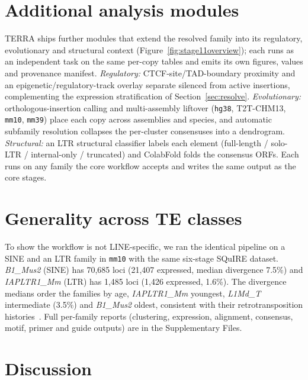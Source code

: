 \documentclass[11pt]{article}
\newcommand{\protoFamily}{L1Md\_T}
\newcommand{\protoAssembly}{mm10}
\newcommand{\protoMedianDiv}{3.5}
\newcommand{\bOneMTLoci}{70,685}
\newcommand{\bOneMTExprLoci}{21,407}
\newcommand{\bOneMTMedianDiv}{7.5}
\newcommand{\iapLoci}{1,485}
\newcommand{\iapExprLoci}{1,426}
\newcommand{\iapMedianDiv}{1.6}
\begin{document}
\section{Additional analysis modules}
\label{sec:exploratory}

TERRA ships further modules that extend the resolved family into its regulatory, evolutionary
and structural context (Figure~\ref{fig:stage11overview}); each runs as an independent task on
the same per-copy tables and emits its own figures, values and provenance manifest.
\emph{Regulatory:} CTCF-site/TAD-boundary proximity and an epigenetic/regulatory-track overlay
separate silenced from active insertions, complementing the expression stratification of
Section~\ref{sec:resolve}. \emph{Evolutionary:} orthologous-insertion calling and multi-assembly
liftover (\texttt{hg38}, T2T-CHM13, \texttt{mm10}, \texttt{mm39}) place each copy across
assemblies and species, and automatic subfamily resolution collapses the per-cluster consensuses
into a dendrogram. \emph{Structural:} an LTR structural classifier labels each element
(full-length / solo-LTR / internal-only / truncated) and ColabFold folds the consensus ORFs.
Each runs on any family the core workflow accepts and writes the same output as the core stages.


\section{Generality across TE classes}
\label{sec:supp}

To show the workflow is not LINE-specific, we ran the identical pipeline on a SINE and an LTR
family in \texttt{\protoAssembly} with the same six-stage SQuIRE dataset. \emph{B1\_Mus2}
(SINE) has \bOneMTLoci{} loci (\bOneMTExprLoci{} expressed, median divergence
\bOneMTMedianDiv\%) and \emph{IAPLTR1\_Mm} (LTR) has \iapLoci{} loci (\iapExprLoci{} expressed,
\iapMedianDiv\%). The divergence medians order the families by age, \emph{IAPLTR1\_Mm} youngest,
\emph{\protoFamily} intermediate (\protoMedianDiv\%) and \emph{B1\_Mus2} oldest, consistent with
their retrotransposition histories~\citep{bourque2018}. Full per-family reports (clustering,
expression, alignment, consensus, motif, primer and guide outputs) are in the Supplementary
Files.

\section{Discussion}
\end{document}
